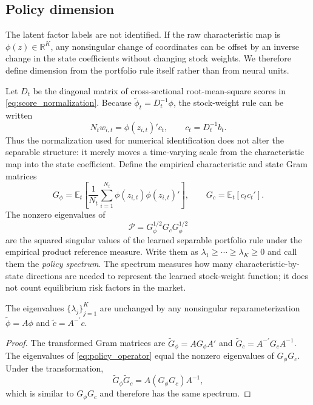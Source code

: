\subsection{Policy dimension}
The latent factor labels are not identified.  If the raw characteristic map is
$\phi(z)\in\mathbb R^K$, any nonsingular change of coordinates can be offset by
an inverse change in the state coefficients without changing stock weights.
We therefore define dimension from the portfolio rule itself rather than from
neural units.

Let $D_t$ be the diagonal matrix of cross-sectional root-mean-square scores in
\eqref{eq:score_normalization}.  Because $\widetilde\phi_t=D_t^{-1}\phi$, the
stock-weight rule can be written
\begin{equation}
N_t w_{i,t}=\phi(z_{i,t})'c_t,\qquad c_t=D_t^{-1}b_t.
\label{eq:separable_policy}
\end{equation}
Thus the normalization used for numerical identification does not alter the
separable structure: it merely moves a time-varying scale from the
characteristic map into the state coefficient.
Define the empirical characteristic and state Gram matrices
\begin{equation}
G_\phi=\mathbb E_t\!\left[\frac{1}{N_t}\sum_{i=1}^{N_t}
\phi(z_{i,t})\phi(z_{i,t})'\right],
\qquad
G_c=\mathbb E_t[c_tc_t'].
\label{eq:policy_grams}
\end{equation}
The nonzero eigenvalues of
\begin{equation}
\mathcal P=G_\phi^{1/2}G_cG_\phi^{1/2}
\label{eq:policy_operator}
\end{equation}
are the squared singular values of the learned separable portfolio rule under
the empirical product reference measure.  Write them as
$\lambda_1\geq\cdots\geq\lambda_K\geq0$ and call them the \emph{policy
spectrum}.  The spectrum measures how many characteristic-by-state directions
are needed to represent the learned stock-weight function; it does not count
equilibrium risk factors in the market.
\begin{proposition}
The eigenvalues $\{\lambda_j\}_{j=1}^K$ are unchanged by any nonsingular
reparameterization $\widetilde\phi=A\phi$ and
$\widetilde c=A^{-\prime}c$.
\end{proposition}
\begin{proof}
The transformed Gram matrices are
$\widetilde G_\phi=AG_\phi A'$ and
$\widetilde G_c=A^{-\prime}G_cA^{-1}$.
The eigenvalues of \eqref{eq:policy_operator} equal the nonzero eigenvalues of
$G_\phi G_c$.  Under the transformation,
\[
\widetilde G_\phi\widetilde G_c
=A(G_\phi G_c)A^{-1},
\]
which is similar to $G_\phi G_c$ and therefore has the same spectrum.
\end{proof}

